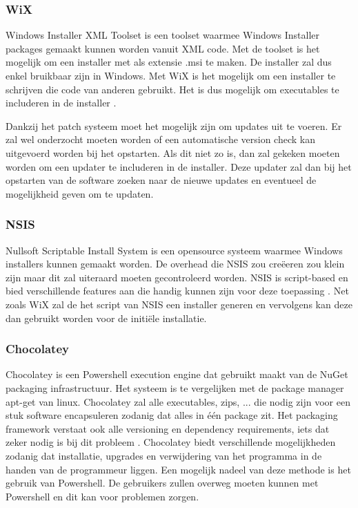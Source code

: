 \documentclass{article}
\begin{document}
\subsubsection{WiX \citep{wixMain}}
Windows Installer XML Toolset is een toolset waarmee Windows Installer packages gemaakt kunnen worden vanuit XML code.
Met de toolset is het mogelijk om een installer met als extensie .msi te maken.
De installer zal dus enkel bruikbaar zijn in Windows.
Met WiX is het mogelijk om een installer te schrijven die code van anderen gebruikt.
Het is dus mogelijk om executables te includeren in de installer \citep{wixMergers}.

Dankzij het patch systeem moet het mogelijk zijn om updates uit te voeren.
Er zal wel onderzocht moeten worden of een automatische version check kan uitgevoerd worden bij het opstarten.
Als dit niet zo is, dan zal gekeken moeten worden om een updater te includeren in de installer.
Deze updater zal dan bij het opstarten van de software zoeken naar de nieuwe updates en eventueel de mogelijkheid geven om te updaten.

\subsubsection{NSIS \citep{nsisMain}}
Nullsoft Scriptable Install System is een opensource systeem waarmee Windows installers kunnen gemaakt worden.
De overhead die NSIS zou cre\"eeren zou klein zijn maar dit zal uiteraard moeten gecontroleerd worden. 
NSIS is script-based en bied verschillende features aan die handig kunnen zijn voor deze toepassing \citep{nsisFeatures}.
Net zoals WiX zal de het script van NSIS een installer generen en vervolgens kan deze dan gebruikt worden voor de initi\"ele installatie.

\subsubsection{Chocolatey \citep{chocoMain}}
Chocolatey is een Powershell execution engine dat gebruikt maakt van de NuGet packaging infrastructuur.
Het systeem is te vergelijken met de package manager apt-get van linux.
Chocolatey zal alle executables, zips, ... die nodig zijn voor een stuk software encapsuleren zodanig dat alles in \'e\'en package zit.
Het packaging framework verstaat ook alle versioning en dependency requirements, iets dat zeker nodig is bij dit probleem \citep{chocoDoc}.
Chocolatey biedt verschillende mogelijkheden zodanig dat installatie, upgrades en verwijdering van het programma in de handen van de programmeur liggen.
Een mogelijk nadeel van deze methode is het gebruik van Powershell. 
De gebruikers zullen overweg moeten kunnen met Powershell en dit kan voor problemen zorgen. 
\end{document}

